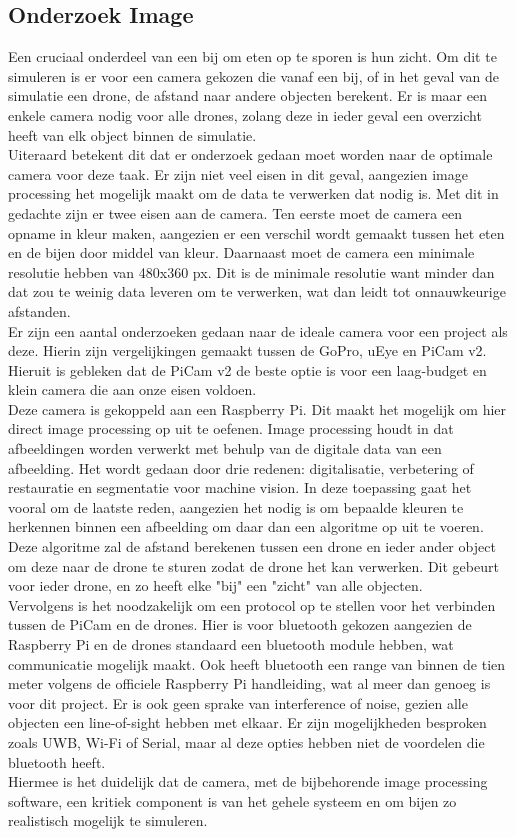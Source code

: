 \subsection{Onderzoek Image}
Een cruciaal onderdeel van een bij om eten op te sporen is hun zicht. Om dit te simuleren is er voor een camera gekozen die vanaf een bij, of in het geval van de simulatie een drone, de afstand naar andere objecten berekent. Er is maar een enkele camera nodig voor alle drones, zolang deze in ieder geval een overzicht heeft van elk object binnen de simulatie.\\
Uiteraard betekent dit dat er onderzoek gedaan moet worden naar de optimale camera voor deze taak. Er zijn niet veel eisen in dit geval, aangezien image processing het mogelijk maakt om de data te verwerken dat nodig is. Met dit in gedachte zijn er twee eisen aan de camera. Ten eerste moet de camera een opname in kleur maken, aangezien er een verschil wordt gemaakt tussen het eten en de bijen door middel van kleur. Daarnaast moet de camera een minimale resolutie hebben van 480x360 px. Dit is de minimale resolutie want minder dan dat zou te weinig data leveren om te verwerken, wat dan leidt tot onnauwkeurige afstanden.\\
Er zijn een aantal onderzoeken gedaan naar de ideale camera voor een project als deze. Hierin zijn vergelijkingen gemaakt tussen de GoPro, uEye en PiCam v2. Hieruit is gebleken dat de PiCam v2 de beste optie is voor een laag-budget en klein camera die aan onze eisen voldoen.\cite{picamstudies}\\
Deze camera is gekoppeld aan een Raspberry Pi. Dit maakt het mogelijk om hier direct image processing op uit te oefenen. Image processing houdt in dat afbeeldingen worden verwerkt met behulp van de digitale data van een afbeelding. Het wordt gedaan door drie redenen: digitalisatie, verbetering of restauratie en segmentatie voor machine vision.\cite{imageprocessing} In deze toepassing gaat het vooral om de laatste reden, aangezien het nodig is om bepaalde kleuren te herkennen binnen een afbeelding om daar dan een algoritme op uit te voeren. Deze algoritme zal de afstand berekenen tussen een drone en ieder ander object om deze naar de drone te sturen zodat de drone het kan verwerken. Dit gebeurt voor ieder drone, en zo heeft elke "bij" een "zicht" van alle objecten.\\
Vervolgens is het noodzakelijk om een protocol op te stellen voor het verbinden tussen de PiCam en de drones. Hier is voor bluetooth gekozen aangezien de Raspberry Pi en de drones standaard een bluetooth module hebben, wat communicatie mogelijk maakt. Ook heeft bluetooth een range van binnen de tien meter volgens de officiele Raspberry Pi handleiding, wat al meer dan genoeg is voor dit project. Er is ook geen sprake van interference of noise, gezien alle objecten een line-of-sight hebben met elkaar. Er zijn mogelijkheden besproken zoals UWB, Wi-Fi of Serial, maar al deze opties hebben niet de voordelen die bluetooth heeft.\\
Hiermee is het duidelijk dat de camera, met de bijbehorende image processing software, een kritiek component is van het gehele systeem en om bijen zo realistisch mogelijk te simuleren.\\
